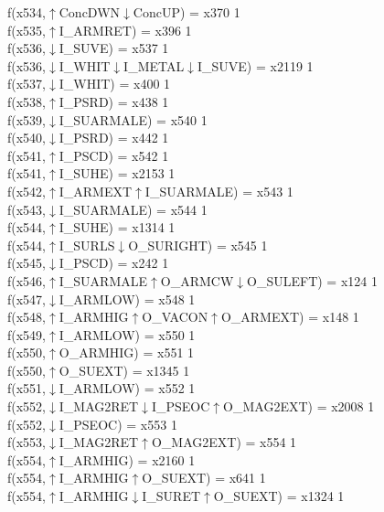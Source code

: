 f(x534,$\uparrow$ConcDWN$\downarrow$ConcUP) = x370 {1} \\
f(x535,$\uparrow$I\_ARMRET) = x396 {1} \\
f(x536,$\downarrow$I\_SUVE) = x537 {1} \\
f(x536,$\downarrow$I\_WHIT$\downarrow$I\_METAL$\downarrow$I\_SUVE) = x2119 {1} \\
f(x537,$\downarrow$I\_WHIT) = x400 {1} \\
f(x538,$\uparrow$I\_PSRD) = x438 {1} \\
f(x539,$\downarrow$I\_SUARMALE) = x540 {1} \\
f(x540,$\downarrow$I\_PSRD) = x442 {1} \\
f(x541,$\uparrow$I\_PSCD) = x542 {1} \\
f(x541,$\uparrow$I\_SUHE) = x2153 {1} \\
f(x542,$\uparrow$I\_ARMEXT$\uparrow$I\_SUARMALE) = x543 {1} \\
f(x543,$\downarrow$I\_SUARMALE) = x544 {1} \\
f(x544,$\uparrow$I\_SUHE) = x1314 {1} \\
f(x544,$\uparrow$I\_SURLS$\downarrow$O\_SURIGHT) = x545 {1} \\
f(x545,$\downarrow$I\_PSCD) = x242 {1} \\
f(x546,$\uparrow$I\_SUARMALE$\uparrow$O\_ARMCW$\downarrow$O\_SULEFT) = x124 {1} \\
f(x547,$\downarrow$I\_ARMLOW) = x548 {1} \\
f(x548,$\uparrow$I\_ARMHIG$\uparrow$O\_VACON$\uparrow$O\_ARMEXT) = x148 {1} \\
f(x549,$\uparrow$I\_ARMLOW) = x550 {1} \\
f(x550,$\uparrow$O\_ARMHIG) = x551 {1} \\
f(x550,$\uparrow$O\_SUEXT) = x1345 {1} \\
f(x551,$\downarrow$I\_ARMLOW) = x552 {1} \\
f(x552,$\downarrow$I\_MAG2RET$\downarrow$I\_PSEOC$\uparrow$O\_MAG2EXT) = x2008 {1} \\
f(x552,$\downarrow$I\_PSEOC) = x553 {1} \\
f(x553,$\downarrow$I\_MAG2RET$\uparrow$O\_MAG2EXT) = x554 {1} \\
f(x554,$\uparrow$I\_ARMHIG) = x2160 {1} \\
f(x554,$\uparrow$I\_ARMHIG$\uparrow$O\_SUEXT) = x641 {1} \\
f(x554,$\uparrow$I\_ARMHIG$\downarrow$I\_SURET$\uparrow$O\_SUEXT) = x1324 {1} \\
